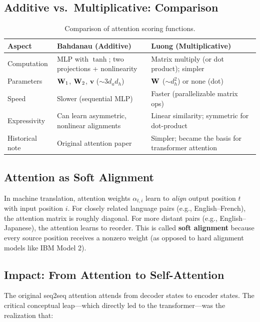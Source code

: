 \subsection{Additive vs.\ Multiplicative: Comparison}

\begin{table}[H]
\centering
\caption{Comparison of attention scoring functions.}
\label{tab:attn_compare}
\begin{tabularx}{\textwidth}{lXX}
\toprule
\textbf{Aspect} & \textbf{Bahdanau (Additive)} & \textbf{Luong (Multiplicative)} \\
\midrule
Computation & MLP with $\tanh$; two projections + nonlinearity & Matrix multiply (or dot product); simpler \\
Parameters & $\mathbf{W}_1$, $\mathbf{W}_2$, $\mathbf{v}$ ($\sim 3 d_a d_h$) & $\mathbf{W}$ ($\sim d_h^2$) or none (dot) \\
Speed & Slower (sequential MLP) & Faster (parallelizable matrix ops) \\
Expressivity & Can learn asymmetric, nonlinear alignments & Linear similarity; symmetric for dot-product \\
Historical note & Original attention paper & Simpler; became the basis for transformer attention \\
\bottomrule
\end{tabularx}
\end{table}

\subsection{Attention as Soft Alignment}

In machine translation, attention weights $\alpha_{t,i}$ learn to
\emph{align} output position $t$ with input position $i$.  For closely
related language pairs (e.g., English--French), the attention matrix is
roughly diagonal.  For more distant pairs (e.g., English--Japanese), the
attention learns to reorder.  This is called \textbf{soft alignment}
because every source position receives a nonzero weight (as opposed to
hard alignment models like IBM Model 2).

\subsection{Impact: From Attention to Self-Attention}

The original seq2seq attention attends from decoder states to encoder
states.  The critical conceptual leap---which directly led to the
transformer---was the realization that:

